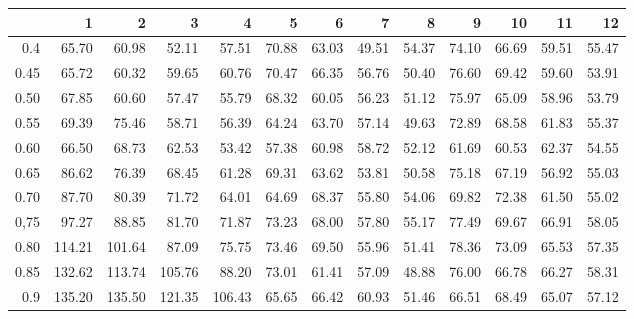 \begin{table}[ht]
\centering
\begin{tabular}{rrrrrrrrrrrrr}
  \hline
 & 1 & 2 & 3 & 4 & 5 & 6 & 7 & 8 & 9 & 10 & 11 & 12 \\ 
  \hline
0.4 & 65.70 & 60.98 & 52.11 & 57.51 & 70.88 & 63.03 & 49.51 & 54.37 & 74.10 & 66.69 & 59.51 & 55.47 \\ 
  0.45 & 65.72 & 60.32 & 59.65 & 60.76 & 70.47 & 66.35 & 56.76 & 50.40 & 76.60 & 69.42 & 59.60 & 53.91 \\ 
  0.50 & 67.85 & 60.60 & 57.47 & 55.79 & 68.32 & 60.05 & 56.23 & 51.12 & 75.97 & 65.09 & 58.96 & 53.79 \\ 
  0.55 & 69.39 & 75.46 & 58.71 & 56.39 & 64.24 & 63.70 & 57.14 & 49.63 & 72.89 & 68.58 & 61.83 & 55.37 \\ 
  0.60 & 66.50 & 68.73 & 62.53 & 53.42 & 57.38 & 60.98 & 58.72 & 52.12 & 61.69 & 60.53 & 62.37 & 54.55 \\ 
  0.65 & 86.62 & 76.39 & 68.45 & 61.28 & 69.31 & 63.62 & 53.81 & 50.58 & 75.18 & 67.19 & 56.92 & 55.03 \\ 
  0.70 & 87.70 & 80.39 & 71.72 & 64.01 & 64.69 & 68.37 & 55.80 & 54.06 & 69.82 & 72.38 & 61.50 & 55.02 \\ 
  0,75 & 97.27 & 88.85 & 81.70 & 71.87 & 73.23 & 68.00 & 57.80 & 55.17 & 77.49 & 69.67 & 66.91 & 58.05 \\ 
  0.80 & 114.21 & 101.64 & 87.09 & 75.75 & 73.46 & 69.50 & 55.96 & 51.41 & 78.36 & 73.09 & 65.53 & 57.35 \\ 
  0.85 & 132.62 & 113.74 & 105.76 & 88.20 & 73.01 & 61.41 & 57.09 & 48.88 & 76.00 & 66.78 & 66.27 & 58.31 \\ 
  0.9 & 135.20 & 135.50 & 121.35 & 106.43 & 65.65 & 66.42 & 60.93 & 51.46 & 66.51 & 68.49 & 65.07 & 57.12 \\ 
   \hline
\end{tabular}
\end{table}

